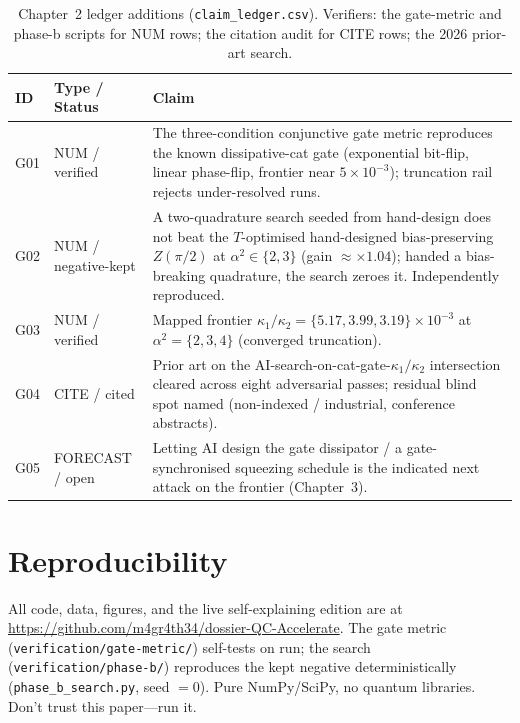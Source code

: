 \documentclass[11pt]{article}
\begin{document}
\begin{table}[h]\centering\small
\renewcommand{\arraystretch}{1.25}
\begin{tabular}{@{}llp{8.2cm}@{}}
\hline
\textbf{ID} & \textbf{Type / Status} & \textbf{Claim} \\
\hline
G01 & NUM / verified & The three-condition conjunctive gate metric reproduces the known
dissipative-cat gate (exponential bit-flip, linear phase-flip, frontier near
$5\times10^{-3}$); truncation rail rejects under-resolved runs. \\
G02 & NUM / negative-kept & A two-quadrature search seeded from hand-design does not beat the
$T$-optimised hand-designed bias-preserving $Z(\pi/2)$ at $\alpha^2\in\{2,3\}$ (gain
$\approx\times1.04$); handed a bias-breaking quadrature, the search zeroes it. Independently
reproduced. \\
G03 & NUM / verified & Mapped frontier $\kappa_1/\kappa_2 = \{5.17,3.99,3.19\}\times10^{-3}$ at
$\alpha^2=\{2,3,4\}$ (converged truncation). \\
G04 & CITE / cited & Prior art on the AI-search-on-cat-gate-$\kappa_1/\kappa_2$ intersection
cleared across eight adversarial passes; residual blind spot named (non-indexed / industrial,
conference abstracts). \\
G05 & FORECAST / open & Letting AI design the gate dissipator / a gate-synchronised squeezing
schedule is the indicated next attack on the frontier (Chapter~3). \\
\hline
\end{tabular}
\caption{Chapter~2 ledger additions (\texttt{claim\_ledger.csv}). Verifiers: the gate-metric
and phase-b scripts for NUM rows; the citation audit for CITE rows; the 2026 prior-art search.}
\label{tab:ledger}
\end{table}

\section*{Reproducibility}
All code, data, figures, and the live self-explaining edition are at
\url{https://github.com/m4gr4th34/dossier-QC-Accelerate}. The gate metric
(\texttt{verification/gate-metric/}) self-tests on run; the search
(\texttt{verification/phase-b/}) reproduces the kept negative deterministically
(\texttt{phase\_b\_search.py}, seed $=0$). Pure NumPy/SciPy, no quantum libraries.
Don't trust this paper---run it.
\end{document}
